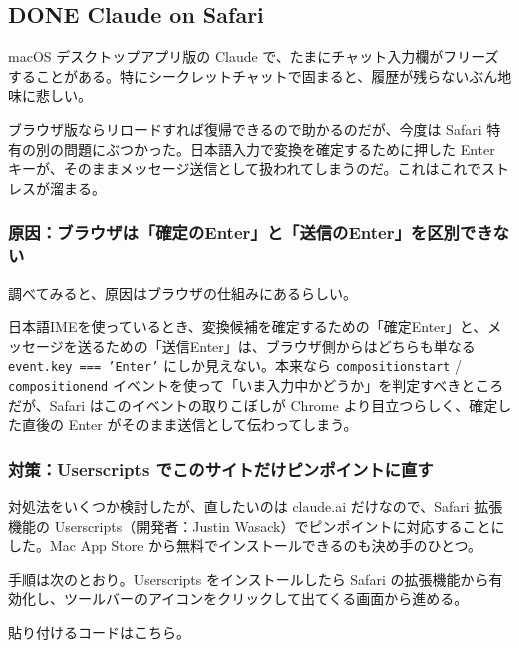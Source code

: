 \documentclass[11pt]{article}
\begin{document}
\subsection{{\bfseries\sffamily DONE} Claude on Safari}
\label{sec:org96b0a71}
macOS デスクトップアプリ版の Claude で、たまにチャット入力欄がフリーズすることがある。特にシークレットチャットで固まると、履歴が残らないぶん地味に悲しい。

ブラウザ版ならリロードすれば復帰できるので助かるのだが、今度は Safari 特有の別の問題にぶつかった。日本語入力で変換を確定するために押した Enter キーが、そのままメッセージ送信として扱われてしまうのだ。これはこれでストレスが溜まる。
\subsubsection{原因：ブラウザは「確定のEnter」と「送信のEnter」を区別できない}
\label{sec:orga8b3c6c}

調べてみると、原因はブラウザの仕組みにあるらしい。

日本語IMEを使っているとき、変換候補を確定するための「確定Enter」と、メッセージを送るための「送信Enter」は、ブラウザ側からはどちらも単なる \texttt{event.key === 'Enter'} にしか見えない。本来なら \texttt{compositionstart} / \texttt{compositionend} イベントを使って「いま入力中かどうか」を判定すべきところだが、Safari はこのイベントの取りこぼしが Chrome より目立つらしく、確定した直後の Enter がそのまま送信として伝わってしまう。
\subsubsection{対策：Userscripts でこのサイトだけピンポイントに直す}
\label{sec:org0a7689b}

対処法をいくつか検討したが、直したいのは claude.ai だけなので、Safari 拡張機能の Userscripts（開発者：Justin Wasack）でピンポイントに対応することにした。Mac App Store から無料でインストールできるのも決め手のひとつ。

手順は次のとおり。Userscripts をインストールしたら Safari の拡張機能から有効化し、ツールバーのアイコンをクリックして出てくる画面から進める。

貼り付けるコードはこちら。
\end{document}
